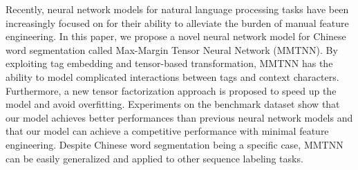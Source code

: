 Recently, neural network models for natural language processing tasks have been increasingly focused on for their ability to alleviate the burden of manual feature engineering. In this paper, we propose a novel neural network model for Chinese word segmentation called Max-Margin Tensor Neural Network (MMTNN). By exploiting tag embedding and tensor-based transformation, MMTNN has the ability to model complicated interactions between tags and context characters. Furthermore, a new tensor factorization approach is proposed to speed up the model and avoid overfitting. Experiments on the benchmark dataset show that our model achieves better performances than previous neural network models and that our model can achieve a competitive performance with minimal feature engineering. Despite Chinese word segmentation being a specific case, MMTNN can be easily generalized and applied to other sequence labeling tasks.

